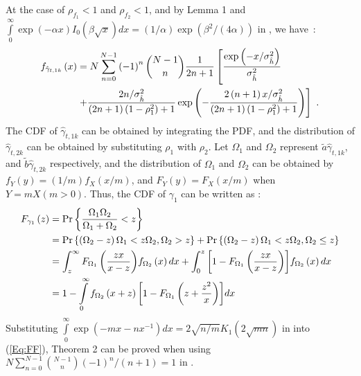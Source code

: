 \documentclass[onecolumn,letterpaper,11pt,draftclsnofoot]{IEEEtran}
\begin{document}
At the case of $\rho_{f_1} < 1$ and $\rho_{f_2}<1$, and by Lemma 1
and $ \int\limits_0^\infty {\exp \left( - \alpha x\right)I_0
\left(\beta \sqrt x \right)} dx = \left({1}/{\alpha }\right)\exp
\left({{\beta ^2 }}/\left({{4\alpha }}\right)\right)$ in
\cite[(6.614.3)]{Gradshteyn94}, we have~:
\begin{align}
f_{\hat \gamma _{t,1k} } \left( x \right) &= N\sum\limits_{n = 0}^{N
- 1} {\left( { - 1} \right)^n \binom{N-1}{n}} \frac{1}{{2n +
1}}\left[ \frac{{\exp \left( { - x/\sigma _{\hat h}^2 }
\right)}}{{\sigma _{\hat h}^2 }}
\right.\\\notag&\left.+\frac{{2n/\sigma _{\hat h}^2 }}{{\left( {2n +
1} \right)\left( {1 - \rho_1^2 } \right) + 1}}\exp \left( { -
\frac{{2 \left( {n + 1} \right)x/\sigma _{\hat h}^2 }}{{\left( {2n +
1} \right)\left( {1 - \rho_1^2 } \right) + 1}}} \right) \right]~.
\end{align}
The CDF of $\hat \gamma_{t,1k}$ can be obtained by integrating the
PDF, and the distribution of $\hat \gamma _{t,2k}$ can be obtained
by substituting $\rho_1$ with $\rho_2$. Let $\Omega_1$ and
$\Omega_2$ represent $\tilde a\hat \gamma _{t,1k}$, and $\tilde b
\hat \gamma _{t,2k} $ respectively, and the distribution of
$\Omega_1$ and $\Omega_2$ can be obtained by $f_Y \left(y\right) =
\left({1}/{m}\right)f_X \left({x}/{m}\right)$, and $F_Y \left( y
\right) = F_X \left( {x}/{m} \right) $  when $ Y = mX \left(m
> 0\right) $\cite{Paoulis}. Thus, the CDF of $\gamma_1$ can be written as
:
\begin{align}\label{Eq:FF}
F_{\gamma _1 } \left( z \right) &= \Pr \left\{ {\frac{{\Omega _1
\Omega _2 }}{{\Omega _1  + \Omega _2 }} < z} \right\}
\\\notag
& = \Pr \left\{ {\left( {\Omega _2  - z} \right)\Omega _1  < z\Omega
_2 ,\Omega _2  > z} \right\} + \Pr \left\{ {\left( {\Omega _2  - z}
\right)\Omega _1  < z\Omega _2 ,\Omega _2  \le z} \right\}
\\\notag
&= \int_z^\infty  {F_{\Omega _1 } \left( {\frac{{zx}}{{x - z}}}
\right)} f_{\Omega _2 } \left(x\right)dx + \int_0^z {\left[ {1 -
F_{\Omega _1 } \left( {\frac{{zx}}{{x - z}}} \right)} \right]}
f_{\Omega _2 } \left( x \right)dx
\\\notag
&= 1 - \int\limits_0^\infty  {f_{\Omega _2 } \left( {x + z}
\right)\left[ {1 - F_{\Omega _1 } \left( {z + \frac{{z^2 }}{x}}
\right)} \right]} dx
\end{align}
Substituting $ \int\limits_0^\infty  {\exp \left( - mx - nx^{ - 1}
\right)} dx = 2\sqrt {{n}/{m}} K_1 \left(2\sqrt {mn} \right)$ in
\cite[(3.324)]{Gradshteyn94} into (\ref{Eq:FF}), Theorem 2 can be
proved when using $N\sum\nolimits_{n = 0}^{N - 1}
{\binom{N-1}{n}{{\left( { - 1} \right)^n }}/\left({{n + 1}}\right)}
= 1 $ in \cite[(0.155.1)]{Gradshteyn94}.
\end{document}
